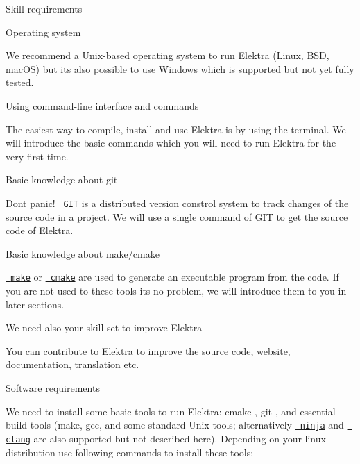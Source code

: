 \label{doc_GETSTARTED_md_md_doc_GETSTARTED}%
%

\begin{DoxyItemize}
\item Skill requirements
\begin{DoxyItemize}
\item Operating system

We recommend a Unix-\/based operating system to run Elektra (Linux, BSD, mac\+OS) but it\textquotesingle{}s also possible to use Windows which is supported but not yet fully tested.
\item Using command-\/line interface and commands

The easiest way to compile, install and use Elektra is by using the terminal. We will introduce the basic commands which you will need to run Elektra for the very first time.
\item Basic knowledge about git

Dont panic! \href{https://git-scm.com/}{\texttt{ GIT}} is a distributed version constrol system to track changes of the source code in a project. We will use a single command of GIT to get the source code of Elektra.
\item Basic knowledge about make/cmake

\href{https://www.gnu.org/software/make/}{\texttt{ make}} or \href{https://cmake.org/}{\texttt{ cmake}} are used to generate an executable program from the code. If you are not used to these tools its no problem, we will introduce them to you in later sections.
\item We need also your skill set to improve Elektra

You can contribute to Elektra to improve the source code, website, documentation, translation etc.
\end{DoxyItemize}
\item Software requirements

We need to install some basic tools to run Elektra\+: cmake , git , and essential build tools (make, gcc, and some standard Unix tools; alternatively \href{https://ninja-build.org/}{\texttt{ ninja}} and \href{https://clang.llvm.org/index.html}{\texttt{ clang}} are also supported but not described here). Depending on your linux distribution use following commands to install these tools\+:
\end{DoxyItemize}


\begin{DoxyCode}{0}

\end{DoxyCode}


